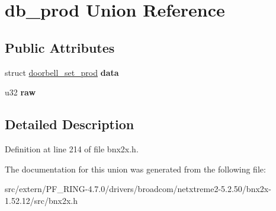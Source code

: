 \hypertarget{uniondb__prod}{
\section{db\_\-prod Union Reference}
\label{uniondb__prod}
}
\subsection*{Public Attributes}
\begin{DoxyCompactItemize}
\item 
\hypertarget{uniondb__prod_a5b6b2b98b211e53b2ff7ac3e778a13db}{
struct \hyperlink{structdoorbell__set__prod}{doorbell\_\-set\_\-prod} {\bfseries data}}
\label{uniondb__prod_a5b6b2b98b211e53b2ff7ac3e778a13db}

\item 
\hypertarget{uniondb__prod_a411a4d4a79177d5368aadb89bd67f41f}{
u32 {\bfseries raw}}
\label{uniondb__prod_a411a4d4a79177d5368aadb89bd67f41f}

\end{DoxyCompactItemize}


\subsection{Detailed Description}


Definition at line 214 of file bnx2x.h.



The documentation for this union was generated from the following file:\begin{DoxyCompactItemize}
\item 
src/extern/PF\_\-RING-\/4.7.0/drivers/broadcom/netxtreme2-\/5.2.50/bnx2x-\/1.52.12/src/bnx2x.h\end{DoxyCompactItemize}

